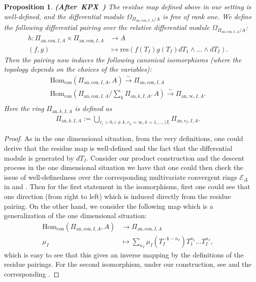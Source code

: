 \documentclass[12pt]{amsart}
\newtheorem{proposition}[theorem]{Proposition}
\theoremstyle{definition}
\numberwithin{equation}{section}
\begin{document}
\begin{proposition} \mbox{\bf{(After KPX \cite[Lemma 2.1.19]{KPX})}}
The residue map defined above in our setting is well-defined, and the differential module $\Omega_{\Pi_{\mathrm{an},\mathrm{con},I,A}/A}$ is free of rank one. We define the following differential pairing over the relative differential module $\Omega_{\Pi_{\mathrm{an},\mathrm{con},I,A}/A}$:
\begin{align}
h:{\Pi_{\mathrm{an},\mathrm{con},I,A}}\times {\Pi_{\mathrm{an},\mathrm{con},I,A}} &\rightarrow A\\
(f,g)	&\mapsto \mathrm{res}(f(T_I)g(T_I)dT_1\wedge...\wedge dT_I).
\end{align}
Then the pairing now induces the following canonical isomorphisms (where the topology depends on the choices of the variables):
\begin{align}
\mathrm{Hom}_{\mathrm{con}}(\Pi_{\mathrm{an},\mathrm{con},I,A},A)\overset{\sim}{\rightarrow}	\Pi_{\mathrm{an},\mathrm{con},I,A}\\
\mathrm{Hom}_{\mathrm{con}}(\Pi_{\mathrm{an},\mathrm{con},I,A}/\sum_{k}\Pi_{\mathrm{an},k,I,A} ,A)\overset{\sim}{\rightarrow}	\Pi_{\mathrm{an},\infty,I,A}.\\
\end{align}
Here the ring $\Pi_{\mathrm{an},k,I,A}$ is defined as
\begin{align}
\Pi_{\mathrm{an},k,I,A}:=\bigcup_{r_i>0,i\neq k, r_k=\infty,k=1,...,|I|}\Pi_{\mathrm{an},r_I,I,A}.	
\end{align}

	
\end{proposition}



\begin{proof}
As in the one dimensional situation, from the very definitions, one could derive that the residue map is well-defined and the fact that the differential module is generated by $dT_I$. Consider our product construction and the descent process in the one dimensional situation we have that one could then check the issue of well-definedness over the corresponding multivariate convergent rings $\mathcal{E}_{\Delta}$ in \cite{CKZ18} and \cite{PZ19}. Then for the first statement in the isomorphisms, first one could see that one direction (from right to left) which is induced directly from the residue pairing. On the other hand, we consider the following map which is a generalization of the one dimensional situation:
\begin{align}
\mathrm{Hom}_{\mathrm{con}}(\Pi_{\mathrm{an},\mathrm{con},I,A},A) &\overset{}{\rightarrow}	\Pi_{\mathrm{an},\mathrm{con},I,A}\\\mu_I	&\mapsto \sum_{n_I}\mu_I(T_I^{-\mathbf{1}-n_I})T_1^{n_1}...T_I^{n_I}, 
\end{align}
which is easy to see that this gives an inverse mapping by the definitions of the residue pairings. For the second isomorphism, under our construction, see \cite[Proposition 5.5]{Cre} and the corresponding \cite[Lemma 8.5.1]{Ked3}.




	
\end{proof}
\end{document}
